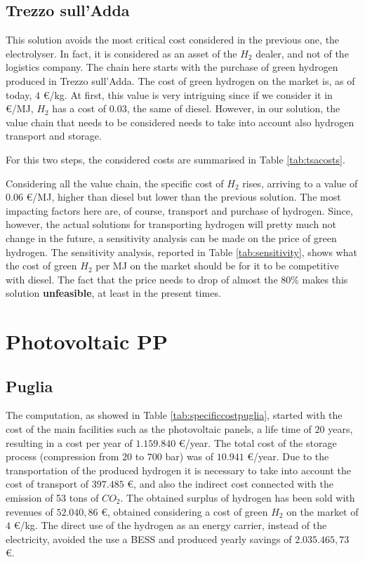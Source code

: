 

\subsection{Trezzo sull'Adda}
This solution avoids the most critical cost considered in the previous one, the electrolyser. In fact, it is considered as an asset of the $H_2$ dealer, and not of the logistics company. The chain here starts with the purchase of green hydrogen produced in Trezzo sull'Adda. The cost of green hydrogen on the market is, as of today, $4$ €/kg. At first, this value is very intriguing since if we consider it in €/MJ, $H_2$  has a cost of $0.03$, the same of diesel. However, in our solution, the value chain that needs to be considered needs to take into account also hydrogen transport and storage.

For this two steps, the considered costs are summarised in Table \ref{tab:tsacosts}\textsuperscript{\cite{dnvgl}}.



Considering all the value chain, the specific cost of $H_2$ rises, arriving to  a value of $0.06$ €/MJ, higher than diesel but lower than the previous solution. The most impacting factors here are, of course, transport and purchase of hydrogen. Since, however, the actual solutions for transporting hydrogen will pretty much not change in the future, a sensitivity analysis can be made on the price of green hydrogen. The sensitivity analysis, reported in Table \ref{tab:sensitivity}, shows what the cost of green $H_2$ per MJ on the market should be for it to be competitive with diesel. The fact that the price needs to drop of almost the $80\%$ makes this solution \textbf{unfeasible}, at least in the present times.



\section{Photovoltaic PP}
\subsection{Puglia}
The computation, as showed in Table \ref{tab:specificcostpuglia}, started with the cost of the main facilities such as the photovoltaic panels, a life time of $20$ years, resulting in a cost per year of $1.159.840$ €/year. The total cost of the storage process (compression from $20$ to $700$ bar) was of $10.941$ €/year. Due to the transportation of the produced hydrogen it is necessary to take into account the cost of transport of $397.485$ €, and also the indirect cost connected with the emission of 53 tons of $CO_2$. The obtained surplus of hydrogen has been sold with revenues of $52.040,86$ €, obtained considering a cost of green $H_2$ on the market of $4$ €/kg\textsuperscript{\cite{Repubblicasauthor2021Lidrogeno2030}}. The direct use of the hydrogen as an energy carrier, instead of the electricity, avoided the use a BESS and produced yearly savings of $2.035.465,73$ €. 

